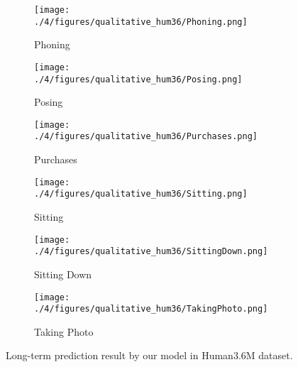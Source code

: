 \begin{figure}
     \centering
     \begin{subfigure}{0.45\textwidth}
         \centering
         \texttt{[image: ./4/figures/qualitative\_hum36/Phoning.png]}
         \caption{Phoning}
         \label{fig:3d_long_phoning}
     \end{subfigure}
     \begin{subfigure}{0.45\textwidth}
         \centering
         \texttt{[image: ./4/figures/qualitative\_hum36/Posing.png]}
         \caption{Posing}
         \label{fig:3d_long_posing}
     \end{subfigure}
     
     \begin{subfigure}{0.45\textwidth}
         \centering
         \texttt{[image: ./4/figures/qualitative\_hum36/Purchases.png]}
         \caption{Purchases}
         \label{fig:3d_long_purchases}
     \end{subfigure}
     \begin{subfigure}{0.45\textwidth}
         \centering
         \texttt{[image: ./4/figures/qualitative\_hum36/Sitting.png]}
         \caption{Sitting}
         \label{fig:3d_long_sitting}
     \end{subfigure}

     \begin{subfigure}{0.45\textwidth}
         \centering
         \texttt{[image: ./4/figures/qualitative\_hum36/SittingDown.png]}
         \caption{Sitting Down}
         \label{fig:3d_long_sittingdown}
     \end{subfigure}
     \begin{subfigure}{0.45\textwidth}
         \centering
         \texttt{[image: ./4/figures/qualitative\_hum36/TakingPhoto.png]}
         \caption{Taking Photo}
         \label{fig:3d_long_takingphoto}
     \end{subfigure}
    
     \caption{Long-term prediction result by our model in Human3.6M dataset.}
     \label{fig:3D_long_qual_2}
\end{figure}

